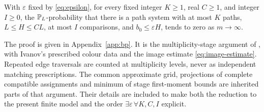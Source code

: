 \begin{theorem}\label{thm:bp}
With $\varepsilon$ fixed by \eqref{eq:epsilon}, for every fixed integer $K\ge1$, real $C\ge1$, and integer $I\ge0$, the $\mathbb P_L$-probability that there is a path system with at most $K$ paths, $L\le H\le CL$, at most $I$ comparisons, and $b_0\le\varepsilon H$, tends to zero as $m\to\infty$.
\end{theorem}

The proof is given in Appendix~\ref{app:bp}. It is the multiplicity-stage argument of \cite[Theorem~4.1, Lemmas~4.2--4.4]{OAI197a}, with Ivanov's prescribed colour data \cite[Section~6.1]{Iva26} and the image estimate \eqref{eq:image-estimate}. Repeated edge traversals are counted at multiplicity levels, never as independent matching prescriptions. The common approximate grid, projections of complete compatible assignments and minimum of stage first-moment bounds are inherited parts of that argument. Their details are included to make both the reduction to the present finite model and the order $\exists\varepsilon\,\forall K,C,I$ explicit.
